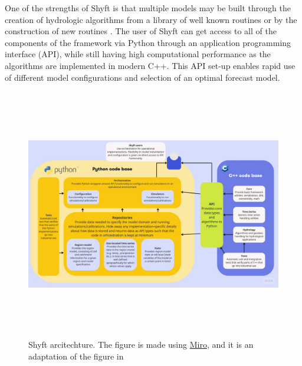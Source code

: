 One of the strengths of Shyft is that multiple models may be built through the creation of hydrologic algorithms from a library of well known routines or by the construction of new routines \parencite{burkhart_shyft_2021}. The user of Shyft can get access to all of the components of the framework via Python through an application programming interface (API), while still having high computational performance as the algorithms are implemented in modern C++. This API set-up enables rapid use of different model configurations and selection of an optimal forecast model.

\begin{figure}[ht]
    \centering
    \includegraphics[width=1.1\textwidth,height=11cm]{figures/methods/Shyft Architecture.jpg}
    \caption{Shyft arcitechture. The figure is made using \href{https://miro.com}{Miro}, and it is an adaptation of the figure in \cite{burkhart_shyft_2021}}
    \label{fig:shyft_architecture}
\end{figure}


